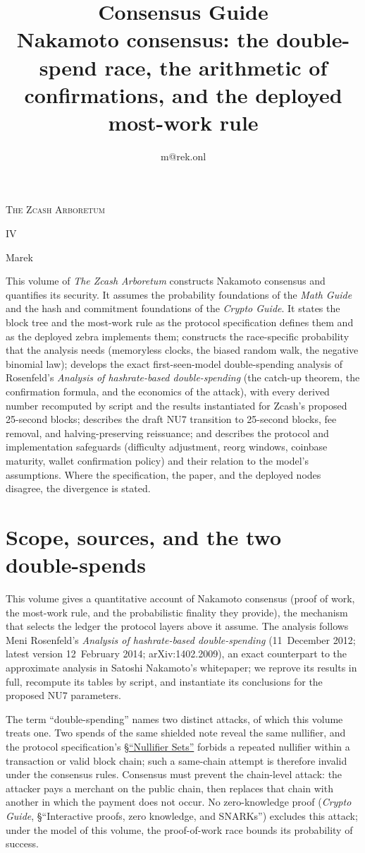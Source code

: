 \documentclass[11pt,a4paper]{article}
\title{\textbf{\Huge Consensus Guide}\\[6pt]\large Nakamoto consensus: the double-spend race, the arithmetic of confirmations, and the deployed most-work rule}
\author{m@rek.onl}
\date{}
\makeatletter
\theoremstyle{definition}
\let\arb@tableofcontents\tableofcontents
\renewcommand{\tableofcontents}{{\hypersetup{pdfborderstyle={/S/U/W 0}}%
  \arb@tableofcontents}}
\providecommand{\accession}{}
\def\arb@name#1#2\@nil{\def\arbvolname{#2}}
\def\arb@parsetitle\textbf#1\\[#2]#3#4\@nil{\arb@name#1\@nil\def\arb@sub{#4}}
\providecommand{\arbvolname}{}
\renewcommand{\maketitle}{\expandafter\arb@parsetitle\@title\@nil
  \hypersetup{pdftitle={\arbvolname: \arb@sub},pdfauthor={Marek}}%
  \thispagestyle{empty}\begingroup\raggedright
  {\fontsize{13.2}{16}\selectfont\scshape The Zcash Arboretum\par}
  \vspace*{50mm}
  {\fontsize{47.3}{50}\selectfont\accession\par}
  \vspace{6mm}
  {\fontsize{22.8}{27}\selectfont\arbvolname\par}
  \vspace{3mm}
  {\fontsize{13.2}{17}\selectfont\arb@sub\par}
  \vspace{18mm}
  {\fontsize{13.2}{17}\selectfont Marek\par}
  {\small\@author\par}
  \endgroup\clearpage}
\renewenvironment{abstract}{%
  \small\begin{center}{\bfseries\abstractname}\end{center}\medskip\noindent\ignorespaces
}{\par\medskip}
\renewcommand{\accession}{IV}
\makeatother
\begin{document}
\maketitle
\begin{abstract}
This volume of \emph{The Zcash Arboretum} constructs Nakamoto consensus and
quantifies its security. It assumes the probability foundations of the
\emph{Math Guide} and the hash and commitment foundations of the
\emph{Crypto Guide}. It states the block tree and the most-work rule as the
protocol specification defines them and as the deployed \textsf{zebra}
implements them;
constructs the race-specific probability that the analysis needs (memoryless
clocks, the biased random walk, the negative binomial law); develops the exact
first-seen-model double-spending analysis of Rosenfeld's \emph{Analysis of
hashrate-based double-spending} (the catch-up theorem, the confirmation
formula, and the economics of the attack), with every derived number
recomputed by script and the results instantiated for Zcash's proposed
25-second blocks; describes the draft NU7 transition to 25-second blocks, fee
removal, and halving-preserving reissuance; and describes the protocol and
implementation safeguards (difficulty adjustment, reorg windows, coinbase
maturity, wallet confirmation policy) and their relation to the model's
assumptions. Where the
specification, the paper, and the deployed nodes disagree, the divergence is
stated.
\end{abstract}
\clearpage
\tableofcontents
\clearpage

\section{Scope, sources, and the two double-spends}\label{sec:cons-scope}

This volume gives a quantitative account of Nakamoto consensus (proof of
work, the most-work rule, and the probabilistic finality they provide), the
mechanism that selects the ledger the protocol layers above it assume. The
analysis follows Meni Rosenfeld's \emph{Analysis of hashrate-based
double-spending}
(11~December 2012; latest version 12~February 2014; arXiv:1402.2009), an exact
counterpart to the approximate analysis in Satoshi Nakamoto's whitepaper; we
reprove its results in full, recompute its tables by script, and instantiate
its conclusions for the proposed NU7 parameters.

The term ``double-spending'' names two distinct attacks, of which this volume
treats one. Two spends of the same shielded note reveal the same nullifier,
and the protocol specification's
\href{https://zips.z.cash/protocol/protocol.pdf\#nullifierset}{\S``Nullifier Sets''}
forbids a repeated nullifier within a transaction or valid block chain; such a
same-chain attempt is therefore invalid under the consensus rules. Consensus
must prevent the chain-level attack: the attacker pays a merchant on the
public chain, then replaces that chain with another in which the payment does
not occur. No zero-knowledge proof (\emph{Crypto Guide}, \S``Interactive
proofs, zero knowledge, and SNARKs'') excludes this attack; under the model of
this volume, the proof-of-work race bounds its probability of success.
\end{document}
